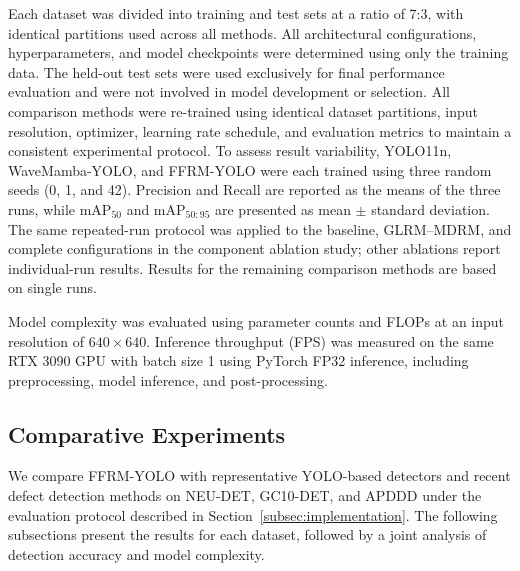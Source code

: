 \documentclass[pdflatex,sn-nature]{sn-jnl}
\begin{document}
Each dataset was divided into training and test sets
at a ratio of 7:3, with identical partitions used
across all methods. All architectural configurations,
hyperparameters, and model checkpoints were determined
using only the training data. The held-out test sets
were used exclusively for final performance evaluation
and were not involved in model development or selection. All comparison methods were re-trained using identical dataset partitions, input resolution, optimizer, learning rate schedule, and evaluation metrics to maintain a consistent experimental protocol.
To assess result variability, YOLO11n, WaveMamba-YOLO, and
FFRM-YOLO were each trained using three random seeds
(0, 1, and 42). Precision and Recall are reported as
the means of the three runs, while mAP$_{50}$ and
mAP$_{50:95}$ are presented as mean $\pm$ standard
deviation. The same repeated-run protocol was applied
to the baseline, GLRM--MDRM, and complete configurations
in the component ablation study; other ablations
report individual-run results. Results for the remaining
comparison methods are based on single runs.

Model complexity was evaluated using parameter counts and
FLOPs at an input resolution of $640 \times 640$.
Inference throughput (FPS) was measured on the same RTX 3090
GPU with batch size 1 using PyTorch FP32 inference, including
preprocessing, model inference, and post-processing.


\subsection{Comparative Experiments}
\label{subsec:comparison}

We compare FFRM-YOLO with representative YOLO-based detectors and recent defect detection methods on NEU-DET, GC10-DET, and APDDD under the evaluation protocol described in Section~\ref{subsec:implementation}. The following subsections present the results for each dataset, followed by a joint analysis of detection accuracy and model complexity.
\end{document}
